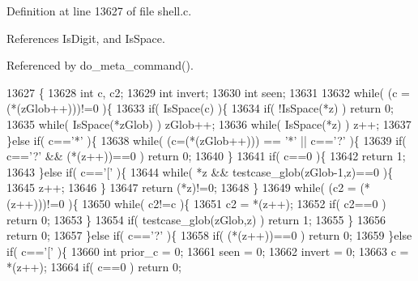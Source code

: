 Definition at line 13627 of file shell.\+c.



References Is\+Digit, and Is\+Space.



Referenced by do\+\_\+meta\+\_\+command().


\begin{DoxyCode}
13627                                                           \{
13628   \textcolor{keywordtype}{int} c, c2;
13629   \textcolor{keywordtype}{int} invert;
13630   \textcolor{keywordtype}{int} seen;
13631 
13632   \textcolor{keywordflow}{while}( (c = (*(zGlob++)))!=0 )\{
13633     \textcolor{keywordflow}{if}( IsSpace(c) )\{
13634       \textcolor{keywordflow}{if}( !IsSpace(*z) ) \textcolor{keywordflow}{return} 0;
13635       \textcolor{keywordflow}{while}( IsSpace(*zGlob) ) zGlob++;
13636       \textcolor{keywordflow}{while}( IsSpace(*z) ) z++;
13637     \}\textcolor{keywordflow}{else} \textcolor{keywordflow}{if}( c==\textcolor{charliteral}{'*'} )\{
13638       \textcolor{keywordflow}{while}( (c=(*(zGlob++))) == \textcolor{charliteral}{'*'} || c==\textcolor{charliteral}{'?'} )\{
13639         \textcolor{keywordflow}{if}( c==\textcolor{charliteral}{'?'} && (*(z++))==0 ) \textcolor{keywordflow}{return} 0;
13640       \}
13641       \textcolor{keywordflow}{if}( c==0 )\{
13642         \textcolor{keywordflow}{return} 1;
13643       \}\textcolor{keywordflow}{else} \textcolor{keywordflow}{if}( c==\textcolor{charliteral}{'['} )\{
13644         \textcolor{keywordflow}{while}( *z && testcase_glob(zGlob-1,z)==0 )\{
13645           z++;
13646         \}
13647         \textcolor{keywordflow}{return} (*z)!=0;
13648       \}
13649       \textcolor{keywordflow}{while}( (c2 = (*(z++)))!=0 )\{
13650         \textcolor{keywordflow}{while}( c2!=c )\{
13651           c2 = *(z++);
13652           \textcolor{keywordflow}{if}( c2==0 ) \textcolor{keywordflow}{return} 0;
13653         \}
13654         \textcolor{keywordflow}{if}( testcase_glob(zGlob,z) ) \textcolor{keywordflow}{return} 1;
13655       \}
13656       \textcolor{keywordflow}{return} 0;
13657     \}\textcolor{keywordflow}{else} \textcolor{keywordflow}{if}( c==\textcolor{charliteral}{'?'} )\{
13658       \textcolor{keywordflow}{if}( (*(z++))==0 ) \textcolor{keywordflow}{return} 0;
13659     \}\textcolor{keywordflow}{else} \textcolor{keywordflow}{if}( c==\textcolor{charliteral}{'['} )\{
13660       \textcolor{keywordtype}{int} prior\_c = 0;
13661       seen = 0;
13662       invert = 0;
13663       c = *(z++);
13664       \textcolor{keywordflow}{if}( c==0 ) \textcolor{keywordflow}{return} 0;

\end{DoxyCode}
